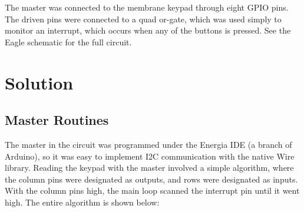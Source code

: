 \documentclass{article}
\begin{document}
\noindent The master was connected to the membrane keypad through eight GPIO pins. The driven pins were connected to a quad or-gate, which was used simply to monitor an interrupt, which occurs when any of the buttons is pressed. See the Eagle schematic for the full circuit.



%
%



\section*{Solution}
\subsection*{Master Routines}

The master in the circuit was programmed under the Energia IDE (a branch of Arduino), so it was easy to implement I2C communication with the native Wire library. Reading the keypad with the master involved a simple algorithm, where the column pins were designated as outputs, and rows were designated as inputs. With the column pins high, the main loop scanned the interrupt pin until it went high. The entire algorithm is shown below:

\end{document}
